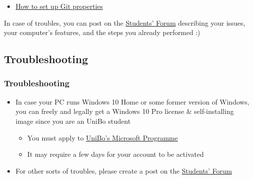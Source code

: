 \documentclass[handout]{beamer}\mode<presentation>{\usetheme{AMSCesenaPurpleAndGold}}
\begin{document}
\begin{frame}
\begin{itemize}
		\item \href{https://git-scm.com/book/en/v2/Customizing-Git-Git-Configuration}{How to set up Git properties}
	\end{itemize}

	\begin{block}{}
		In case of troubles, you can post on the \href{https://iol.unibo.it/mod/forum/view.php?id=123707}{Students' Forum} \alert{describing your issues}, your computer's features, and the steps you already performed :)
	\end{block}

\end{frame}

\subsection{Troubleshooting}

\begin{frame}\label{troubleshooting}
\frametitle{Troubleshooting} 
	\begin{itemize}
		\item In case your PC runs Windows 10 Home or some former version of Windows, you can freely and legally get a Windows 10 Pro license \& self-installing image since you are an UniBo student
		\begin{itemize}
			\item You must apply to \href{https://dreamspark.campusfc.unibo.it/}{UniBo's Microsoft Programme}
			\item It may require a few days for your account to be activated 
		\end{itemize}
	
		\vspace{.3cm}
	
		\item For other sorts of troubles, please create a post on the \href{https://iol.unibo.it/mod/forum/view.php?id=123707}{Students' Forum}
		
	\end{itemize}
\end{frame}

\maketitle

\end{document}
